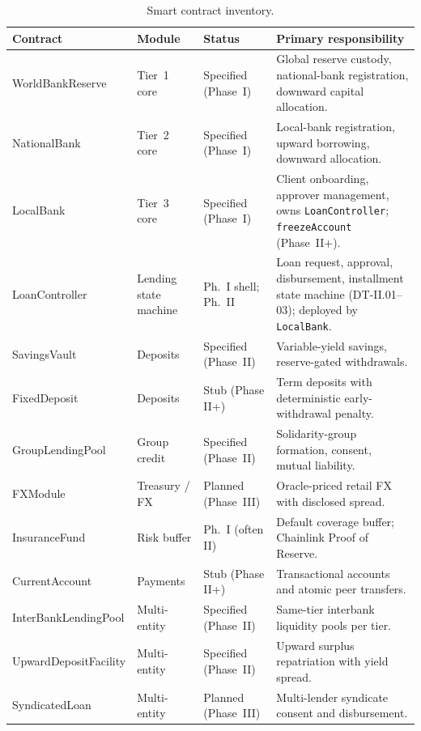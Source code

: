 \begin{table}[H]
\centering
\caption[Smart contract inventory]{Smart contract inventory.}
\label{tab:contract-inventory}
\footnotesize
\setlength{\tabcolsep}{3.5pt}
\renewcommand{\arraystretch}{1.12}
\begin{tabular}{@{}>{\raggedright\arraybackslash}p{2.75cm}>{\raggedright\arraybackslash}p{1.85cm}>{\raggedright\arraybackslash}p{1.65cm}>{\raggedright\arraybackslash}p{6.85cm}@{}}
\toprule
\tableheadcolor
\textbf{Contract} & \textbf{Module} & \textbf{Status} & \textbf{Primary responsibility} \\
\midrule
WorldBankReserve & Tier~1 core & Specified (Phase~I) & Global reserve custody, national-bank registration, downward capital allocation. \\
NationalBank & Tier~2 core & Specified (Phase~I) & Local-bank registration, upward borrowing, downward allocation. \\
LocalBank & Tier~3 core & Specified (Phase~I) & Client onboarding, approver management, owns \texttt{LoanController}; \texttt{freezeAccount} (Phase~II+). \\
LoanController & Lending state machine & Ph.~I shell; Ph.~II & Loan request, approval, disbursement, installment state machine (DT-II.01--03); deployed by \texttt{LocalBank}. \\
SavingsVault & Deposits & Specified (Phase~II) & Variable-yield savings, reserve-gated withdrawals. \\
FixedDeposit & Deposits & Stub (Phase II+) & Term deposits with deterministic early-withdrawal penalty. \\
GroupLendingPool & Group credit & Specified (Phase~II) & Solidarity-group formation, consent, mutual liability. \\
FXModule & Treasury / FX & Planned (Phase~III) & Oracle-priced retail FX with disclosed spread. \\
InsuranceFund & Risk buffer & Ph.~I (often II) & Default coverage buffer; Chainlink Proof of Reserve. \\
CurrentAccount & Payments & Stub (Phase II+) & Transactional accounts and atomic peer transfers. \\
Inter\-Bank\-Lending\-Pool & Multi-entity & Specified (Phase~II) & Same-tier interbank liquidity pools per tier. \\
Upward\-Deposit\-Facility & Multi-entity & Specified (Phase~II) & Upward surplus repatriation with yield spread. \\
SyndicatedLoan & Multi-entity & Planned (Phase~III) & Multi-lender syndicate consent and disbursement. \\

\end{tabular}
\end{table}
